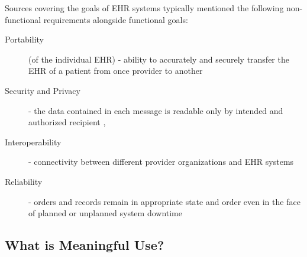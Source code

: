 \documentclass[10pt]{article}
\begin{document}



Sources covering the goals of EHR systems typically mentioned the following non-functional requirements alongside functional goals:

\begin{description}
	\item[Portability] (of the individual EHR) - ability to accurately and securely transfer the EHR of a patient from once provider to another \cite{ehrbook}
	\item[Security and Privacy] - the data contained in each message is readable only by intended and authorized recipient \cite{ehrbook}, \cite{auditingprivacy}
	\item[Interoperability] - connectivity between different provider organizations and EHR systems \cite{ehrbook}
	\item[Reliability] - orders and records remain in appropriate state and order even in the face of planned or unplanned system downtime  \cite{ehrbook}
\end{description}




\subsection{What is Meaningful Use?}
\label{sec:Define Meaningful Use}
\end{document}

